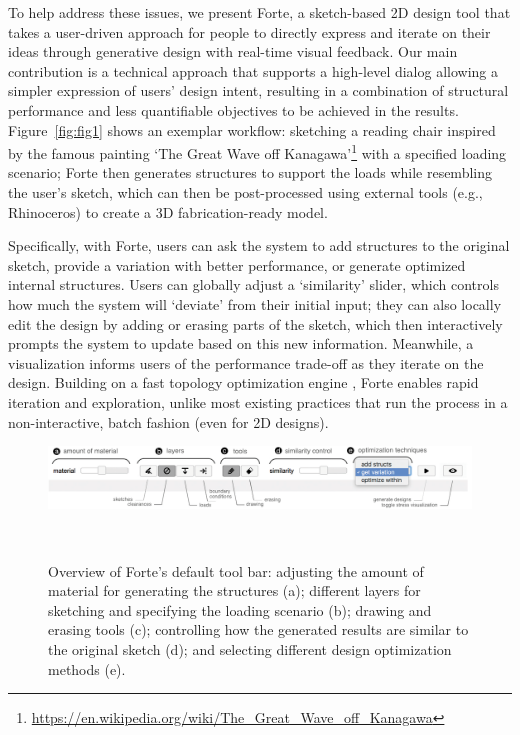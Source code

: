 
To help address these issues, we present Forte, a sketch-based 2D design tool that takes a user-driven approach for people to directly express and iterate on their ideas through generative design with real-time visual feedback.
Our main contribution is a technical approach that supports a high-level dialog allowing a simpler expression of users' design intent, resulting in a combination of structural performance and less quantifiable objectives to be achieved in the results. Figure~\ref{fig:fig1} shows an exemplar workflow: sketching a reading chair inspired by the famous painting `The Great Wave off Kanagawa'\footnote{\url{https://en.wikipedia.org/wiki/The_Great_Wave_off_Kanagawa}} with a specified loading scenario; Forte then generates structures to support the loads while resembling the user's sketch, which can then be post-processed using external tools (e.g., Rhinoceros) to create a 3D fabrication-ready model.

Specifically, with Forte, users can ask the system to add structures to the original sketch, provide a variation with better performance, or generate optimized internal structures.
Users can globally adjust a `similarity' slider, which controls how much the system will `deviate' from their initial input; they can also locally edit the design by adding or erasing parts of the sketch, which then interactively prompts the system to update based on this new information.
Meanwhile, a visualization informs users of the performance trade-off as they iterate on the design.
Building on a fast topology optimization engine \cite{andreassen2011efficient}, Forte enables rapid iteration and exploration, unlike most existing practices that run the process in a non-interactive, batch fashion (even for 2D designs).

\begin{figure} [t]
  \centering
  \includegraphics[width=1\textwidth]{figures/overview}
  \caption{Overview of Forte's default tool bar: adjusting the amount of material for generating the structures (a); different layers for sketching and specifying the loading scenario (b); drawing and erasing tools (c); controlling how the generated results are similar to the original sketch (d); and selecting different design optimization methods (e).}~\label{fig:overview}
\end{figure}

